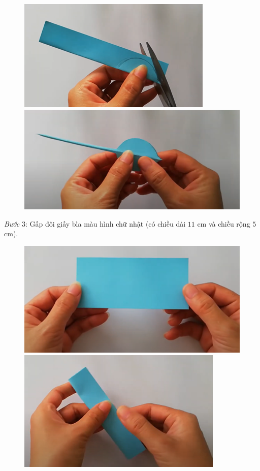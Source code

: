\begin{multicols}{2}
\begin{figure}[H]
		\includegraphics[width= 1\linewidth]{65}
		\includegraphics[width= 1\linewidth]{66}
		\vspace*{-10pt}
	\end{figure}
	\textit{Bước} $3$: Gấp đôi giấy bìa màu hình chữ nhật (có chiều dài $11$ cm và chiều rộng $5$ cm).
	\begin{figure}[H]
		\vspace*{-5pt}
		\centering
		\captionsetup{labelformat= empty, justification=centering}
		\includegraphics[width= 1\linewidth]{67}
		\includegraphics[width= 1\linewidth]{68}

\end{figure}
\end{multicols}
